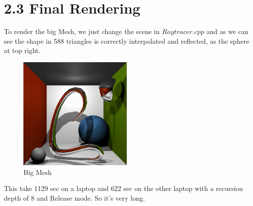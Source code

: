 \documentclass[10pt,a4paper]{report}
\begin{document}
\newpage
\section*{2.3   Final Rendering}
To render the big Mesh, we just change the scene in $Raytracer.cpp$ and as we can see the shape in 588 triangles is correctly interpolated and reflected, as the sphere at top right.
\begin{figure}[h!]
\caption{Big Mesh}
  \centering
    \includegraphics[width=0.5\textwidth]{Cornell.png}
\end{figure}

This take 1129 sec on a laptop and 622 sec on the other laptop with a recursion depth of 8 and Release mode. So it's very long.
\end{document}
